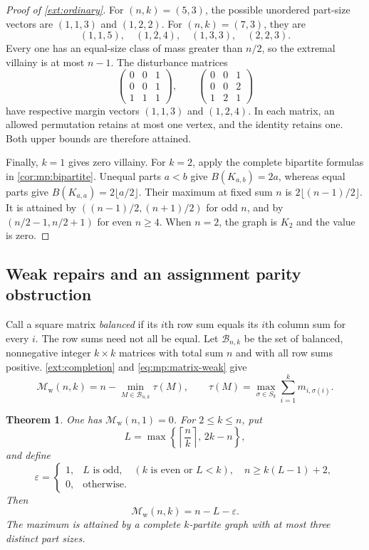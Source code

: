 \documentclass[10pt,a4paper]{amsart}
\numberwithin{equation}{section}
\newtheorem{theorem}{Theorem}[section]
\theoremstyle{definition}
\theoremstyle{remark}
\begin{document}
\begin{proof}[Proof of \cref{ext:ordinary}]
For $(n,k)=(5,3)$, the possible unordered part-size vectors are
$(1,1,3)$ and $(1,2,2)$.  For $(n,k)=(7,3)$, they are
\[
 (1,1,5),\quad (1,2,4),\quad (1,3,3),\quad (2,2,3).
\]
Every one has an equal-size class of mass greater than $n/2$, so the
extremal villainy is at most $n-1$.  The disturbance matrices
\[
 \begin{pmatrix}0&0&1\\0&0&1\\1&1&1\end{pmatrix},
 \qquad
 \begin{pmatrix}0&0&1\\0&0&2\\1&2&1\end{pmatrix}
\]
have respective margin vectors $(1,1,3)$ and $(1,2,4)$.  In each
matrix, an allowed permutation retains at most one vertex, and the
identity retains one.  Both upper bounds are therefore attained.

Finally, $k=1$ gives zero villainy.  For $k=2$, apply the complete
bipartite formulas in \cref{cor:mp:bipartite}.  Unequal
parts $a<b$ give $B(K_{a,b})=2a$, whereas equal parts give
$B(K_{a,a})=2\lfloor a/2\rfloor$.  Their maximum at fixed sum $n$
is $2\lfloor(n-1)/2\rfloor$.  It is attained by
$((n-1)/2,(n+1)/2)$ for odd $n$, and by
$(n/2-1,n/2+1)$ for even $n\ge4$.  When $n=2$, the graph is $K_2$
and the value is zero.
\end{proof}

\subsection{Weak repairs and an assignment parity obstruction}

Call a square matrix \emph{balanced} if its $i$th row sum equals its
$i$th column sum for every $i$.  The row sums need not all be equal.
Let $\mathcal B_{n,k}$ be the set of balanced, nonnegative integer
$k\times k$ matrices with total sum $n$ and with all row sums positive.
\cref{ext:completion} and \eqref{eq:mp:matrix-weak} give
\begin{equation}
\label{ext:weak-matrix}
 \mathcal M_{\mathrm w}(n,k)
   =n-\min_{M\in\mathcal B_{n,k}}\tau(M),
 \qquad
 \tau(M)=\max_{\sigma\in S_k}\sum_{i=1}^k m_{i,\sigma(i)}.
\end{equation}
\begin{theorem}
\label{ext:weak}
One has $\mathcal M_{\mathrm w}(n,1)=0$.  For $2\le k\le n$, put
\[
 L=\max\left\{\left\lceil\frac nk\right\rceil,\,2k-n\right\},
\]
and define
\[
 \varepsilon=
 \begin{cases}
  1,& L\text{ is odd},\quad (k\text{ is even or }L<k),
       \quad n\ge k(L-1)+2,\\
  0,&\text{otherwise}.
 \end{cases}
\]
Then
\[
 \mathcal M_{\mathrm w}(n,k)=n-L-\varepsilon.
\]
The maximum is attained by a complete $k$-partite graph with at most
three distinct part sizes.
\end{theorem}
\end{document}
